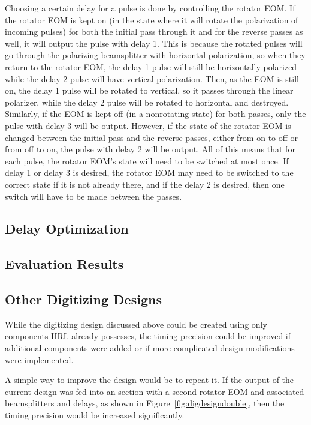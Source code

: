\documentclass[pdftex,12pt,a4paper]{article}
\begin{document}
Choosing a certain delay for a pulse is done by controlling the rotator EOM. If the rotator EOM is kept on (in the state where it will rotate the polarization of incoming pulses) for both the initial pass through it and for the reverse passes as well, it will output the pulse with delay 1. This is because the rotated pulses will go through the polarizing beamsplitter with horizontal polarization, so when they return to the rotator EOM, the delay 1 pulse will still be horizontally polarized while the delay 2 pulse will have vertical polarization. Then, as the EOM is still on, the delay 1 pulse will be rotated to vertical, so it passes through the linear polarizer, while the delay 2 pulse will be rotated to horizontal and destroyed. Similarly, if the EOM is kept off (in a nonrotating state) for both passes, only the pulse with delay 3 will be output. However, if the state of the rotator EOM is changed between the initial pass and the reverse passes, either from on to off or from off to on, the pulse with delay 2 will be output. All of this means that for each pulse, the rotator EOM's state will need to be switched at most once. If delay 1 or delay 3 is desired, the rotator EOM may need to be switched to the correct state if it is not already there, and if the delay 2 is desired, then one switch will have to be made between the passes.

\subsection{Delay Optimization}

\subsection{Evaluation Results}

\subsection{Other Digitizing Designs}
While the digitizing design discussed above could be created using only components HRL already possesses, the timing precision could be improved if additional components were added or if more complicated design modifications were implemented.

A simple way to improve the design would be to repeat it. If the output of the current design was fed into an section with a second rotator EOM and associated beamsplitters and delays, as shown in Figure~\ref{fig:digdesigndouble}, then the timing precision would be increased significantly.
\end{document}
